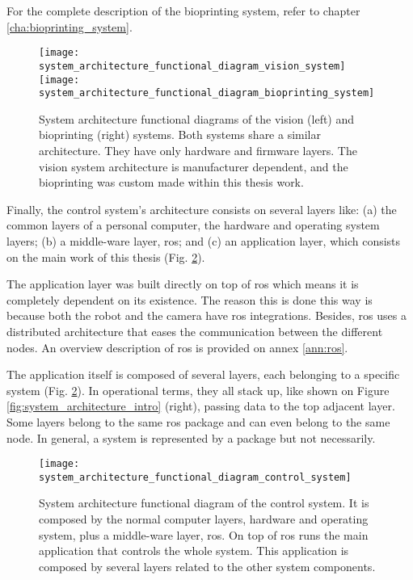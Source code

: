 For the complete description of the bioprinting system, refer to chapter \ref{cha:bioprinting_system}.

\begin{figure}[htbp]
	\centering
	\texttt{[image: system\_architecture\_functional\_diagram\_vision\_system]}
	\hspace{0.1in}
	\texttt{[image: system\_architecture\_functional\_diagram\_bioprinting\_system]}
	\caption{System architecture functional diagrams of the vision (left) and bioprinting (right) systems. Both systems share a similar architecture. They have only hardware and firmware layers. The vision system architecture is manufacturer dependent, and the bioprinting was custom made within this thesis work.}
	\label{fig:system_architecture_functional_diagram_vision_bioprinting_system}
\end{figure}

Finally, the control system's architecture consists on several layers like: (a) the common layers of a personal computer, the hardware and operating system layers; (b) a middle-ware layer, \gls{ros}; and (c) an application layer, which consists on the main work of this thesis (Fig. \ref{fig:system_architecture_functional_diagram_control_system}).

The application layer was built directly on top of \gls{ros} which means it is completely dependent on its existence. The reason this is done this way is because both the robot and the camera have \gls{ros} integrations. Besides, \gls{ros} uses a distributed architecture that eases the communication between the different nodes. An overview description of \gls{ros} is provided on annex \ref{ann:ros}.

The application itself is composed of several layers, each belonging to a specific system (Fig. \ref{fig:system_architecture_functional_diagram_control_system}). In operational terms, they all stack up, like shown on Figure \ref{fig:system_architecture_intro} (right), passing data to the top adjacent layer. Some layers belong to the same \gls{ros} package and can even belong to the same node. In general, a system is represented by a package but not necessarily.

\begin{figure}[htbp]
	\centering
	\texttt{[image: system\_architecture\_functional\_diagram\_control\_system]}
	\caption{System architecture functional diagram of the control system. It is composed by the normal computer layers, hardware and operating system, plus a middle-ware layer, \gls{ros}. On top of \gls{ros} runs the main application that controls the whole system. This application is composed by several layers related to the other system components.}
	\label{fig:system_architecture_functional_diagram_control_system}
\end{figure}

